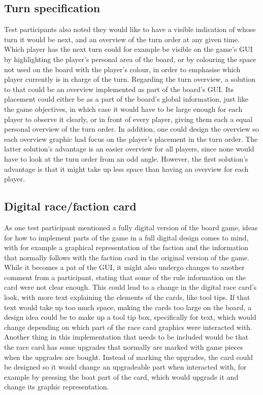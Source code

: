 \subsection{Turn specification}
Test participants also noted they would like to have a visible indication of whose turn it would be next, and an overview of the turn order at any given time. Which player has the next turn could for example be visible on the game's GUI by highlighting the player's personal area of the board, or by colouring the space not used on the board with the player's colour, in order to emphasise which player currently is in charge of the turn.
Regarding the turn overview, a solution to that could be an overview implemented as part of the board's GUI. Its placement could either be as a part of the board's global information, just like the game objectives, in which case it would have to be large enough for each player to observe it clearly, or in front of every player, giving them each a equal personal overview of the turn order. In addition, one could design the overview so each overview graphic had focus on the player's placement in the turn order. The latter solution's advantage is an easier overview for all players, since none would have to look at the turn order from an odd angle. However, the first solution's advantage is that it might take up less space than having an overview for each player.

\subsection{Digital race/faction card}\label{sec:DigiRaceFact}
As one test participant mentioned a fully digital version of the board game, ideas for how to implement parts of the game in a full digital design comes to mind, with for example a graphical representation of the faction and the information that normally follows with the faction card in the original version of the game. While it becomes a pat of the GUI, it might also undergo changes to another comment from a participant, stating that some of the rule information on the card were not clear enough. This could lead to a change in the digital race card's look, with more text explaining the elements of the cards, like tool tips. If that text would take up too much space, making the cards too large on the board, a design idea could be to make up a tool tip box, specifically for text, which would change depending on which part of the race card graphics were interacted with. Another thing in this implementation that needs to be included would be that the race card has some upgrades that normally are marked with game pieces when the upgrades are bought. Instead of marking the upgrades, the card could be designed so it would change an upgradeable part when interacted with, for example by pressing the boat part of the card, which would upgrade it and change its graphic representation.

